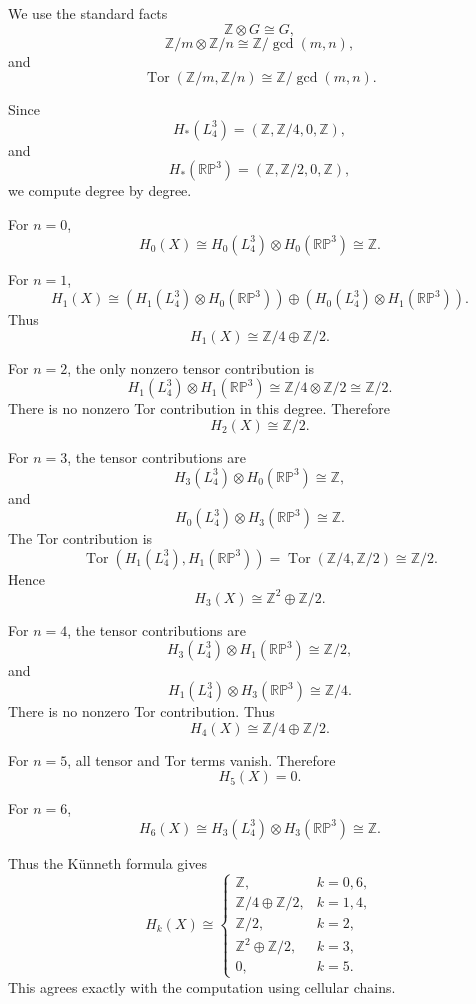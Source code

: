 \begin{solution}
We use the standard facts
\[
\mathbb Z\otimes G\cong G,
\]
\[
\mathbb Z/m\otimes \mathbb Z/n\cong \mathbb Z/\gcd(m,n),
\]
and
\[
\operatorname{Tor}(\mathbb Z/m,\mathbb Z/n)
\cong
\mathbb Z/\gcd(m,n).
\]

Since
\[
H_*(L_4^3)
=
(\mathbb Z,\mathbb Z/4,0,\mathbb Z),
\]
and
\[
H_*(\mathbb{RP}^3)
=
(\mathbb Z,\mathbb Z/2,0,\mathbb Z),
\]
we compute degree by degree.

For \(n=0\),
\[
H_0(X)
\cong
H_0(L_4^3)\otimes H_0(\mathbb{RP}^3)
\cong
\mathbb Z.
\]

For \(n=1\),
\[
H_1(X)
\cong
(H_1(L_4^3)\otimes H_0(\mathbb{RP}^3))
\oplus
(H_0(L_4^3)\otimes H_1(\mathbb{RP}^3)).
\]
Thus
\[
H_1(X)
\cong
\mathbb Z/4\oplus \mathbb Z/2.
\]

For \(n=2\), the only nonzero tensor contribution is
\[
H_1(L_4^3)\otimes H_1(\mathbb{RP}^3)
\cong
\mathbb Z/4\otimes \mathbb Z/2
\cong
\mathbb Z/2.
\]
There is no nonzero Tor contribution in this degree. Therefore
\[
H_2(X)\cong \mathbb Z/2.
\]

For \(n=3\), the tensor contributions are
\[
H_3(L_4^3)\otimes H_0(\mathbb{RP}^3)
\cong
\mathbb Z,
\]
and
\[
H_0(L_4^3)\otimes H_3(\mathbb{RP}^3)
\cong
\mathbb Z.
\]
The Tor contribution is
\[
\operatorname{Tor}(H_1(L_4^3),H_1(\mathbb{RP}^3))
=
\operatorname{Tor}(\mathbb Z/4,\mathbb Z/2)
\cong
\mathbb Z/2.
\]
Hence
\[
H_3(X)
\cong
\mathbb Z^2\oplus \mathbb Z/2.
\]

For \(n=4\), the tensor contributions are
\[
H_3(L_4^3)\otimes H_1(\mathbb{RP}^3)
\cong
\mathbb Z/2,
\]
and
\[
H_1(L_4^3)\otimes H_3(\mathbb{RP}^3)
\cong
\mathbb Z/4.
\]
There is no nonzero Tor contribution. Thus
\[
H_4(X)
\cong
\mathbb Z/4\oplus \mathbb Z/2.
\]

For \(n=5\), all tensor and Tor terms vanish. Therefore
\[
H_5(X)=0.
\]

For \(n=6\),
\[
H_6(X)
\cong
H_3(L_4^3)\otimes H_3(\mathbb{RP}^3)
\cong
\mathbb Z.
\]

Thus the Künneth formula gives
\[
\boxed{
	H_k(X)\cong
	\begin{cases}
		\mathbb Z, & k=0,6,\\[1mm]
		\mathbb Z/4\oplus \mathbb Z/2, & k=1,4,\\[1mm]
		\mathbb Z/2, & k=2,\\[1mm]
		\mathbb Z^2\oplus \mathbb Z/2, & k=3,\\[1mm]
		0, & k=5.
\end{cases}}
\]
This agrees exactly with the computation using cellular chains.



\end{solution}
